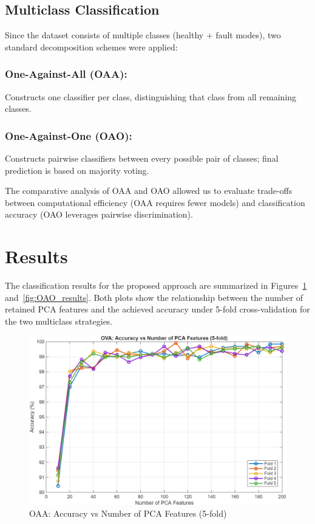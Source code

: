 \documentclass[12pt,a4paper]{article}
\begin{document}
\begin{multicols}{2}
\subsection{Multiclass Classification}
Since the dataset consists of multiple classes (healthy + fault modes), two standard decomposition schemes were applied:
\subsubsection*{One-Against-All (OAA):} Constructs one classifier per class, distinguishing that class from all remaining classes.
\subsubsection*{One-Against-One (OAO):} Constructs pairwise classifiers between every possible pair of classes; final prediction is based on majority voting.

The comparative analysis of OAA and OAO allowed us to evaluate trade-offs between computational efficiency (OAA requires fewer models) and classification accuracy (OAO leverages pairwise discrimination).

\section{Results}
\label{sec:results}
The classification results for the proposed approach are summarized in 
Figures~\ref{fig:OAA_results} and~\ref{fig:OAO_results}. Both plots show the 
relationship between the number of retained PCA features and the achieved 
accuracy under 5-fold cross-validation for the two multiclass strategies.

\begin{figure}[H]
    \centering
    \includegraphics[width=1\linewidth]{Diagrams/res1.png}
    \caption{OAA: Accuracy vs Number of PCA Features (5-fold)}
    \label{fig:OAA_results}
\end{figure}


\end{multicols}
\end{document}
